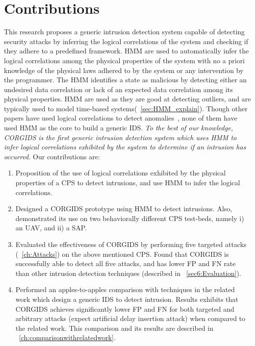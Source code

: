 \section{Contributions}
\label{sec:Contributions}

This research proposes a generic intrusion detection system capable of detecting security attacks by inferring the logical correlations of the system and checking if they adhere to a predefined framework. \ac{HMM}  are used to automatically infer the logical correlations among the physical properties of the system with no a priori knowledge of the physical laws adhered to by the system or any intervention by the programmer. The \ac{HMM} identifies a state as malicious by detecting either an undesired data correlation or lack of an expected data correlation among its physical properties. \ac{HMM} are used as they are good at detecting outliers, and are typically used to model time-based systems(~\autoref{sec:HMM_explain}).  
Though other papers have used logical correlations to detect anomalies~\cite{iturbe2017feasibility,krotofil2015process,chen2018learning,zohrevand2016hidden}, none of them have used \ac{HMM} as the core to build a generic \ac{IDS}. \textit{To the best of our knowledge, \ac{CORGIDS} is the first generic intrusion detection system which uses \ac{HMM} to infer logical correlations exhibited by the system to determine if an intrusion has occurred.} Our contributions are:

\begin{enumerate}

\item Proposition of the use of logical correlations exhibited by the physical properties of a \ac{CPS} to detect intrusions, and use \acf{HMM} to infer the logical correlations.

\item Designed a \acf{CORGIDS} prototype using \acf{HMM} to detect intrusions. Also, demonstrated its use on two behaviorally different \ac{CPS} test-beds, namely i) an \ac{UAV}, and ii) a \acf{SAP}.

\item Evaluated the effectiveness of \ac{CORGIDS} by performing five targeted attacks (~\autoref{ch:Attacks}) on the above mentioned \ac{CPS}. Found that \ac{CORGIDS} is successfully able to detect all five attacks, and has lower \acf{FP} and \acf{FN} rate than other intrusion detection techniques (described in ~\autoref{sec6:Evaluation}).

\item Performed an apples-to-apples comparison with techniques in the related work which design a generic IDS to detect intrusion. Results exhibits that \ac{CORGIDS} achieves significantly lower \ac{FP} and \ac{FN} for both targeted and arbitrary attacks (expect artificial delay insertion attack) when compared to the related work. This comparison and its results are described in ~\autoref{ch:comparisonwithrelatedwork}.

\end{enumerate}

\endinput
